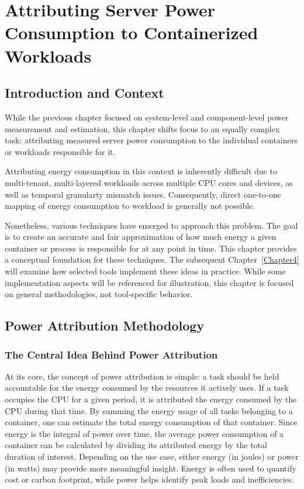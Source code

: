 \chapter{Attributing Server Power Consumption to Containerized Workloads} %
\label{Chapter3}

\section{Introduction and Context}

While the previous chapter focused on system-level and component-level power measurement and estimation, this chapter shifts focus to an equally complex task: attributing measured server power consumption to the individual containers or workloads responsible for it.

Attributing energy consumption in this context is inherently difficult due to  multi-tenant, multi-layered workloads across multiple CPU cores and devices, as well as temporal granularty mismatch issues. Consequently, direct one-to-one mapping of energy consumption to workload is generally not possible.

Nonetheless, various techniques have emerged to approach this problem. The goal is to create an accurate and fair approximation of how much energy a given container or process is responsible for at any point in time. This chapter provides a conceptual foundation for these techniques. The subsequent Chapter~\ref{Chapter4} will examine how selected tools implement these ideas in practice. While some implementation aspects will be referenced for illustration, this chapter is focused on general methodologies, not tool-specific behavior.

\section{Power Attribution Methodology}

\subsection{The Central Idea Behind Power Attribution}

At its core, the concept of power attribution is simple: a task should be held accountable for the energy consumed by the resources it actively uses. If a task occupies the CPU for a given period, it is attributed the energy consumed by the CPU during that time. By summing the energy usage of all tasks belonging to a container, one can estimate the total energy consumption of that container. Since energy is the integral of power over time, the average power consumption of a container can be calculated by dividing its attributed energy by the total duration of interest. Depending on the use case, either energy (in joules) or power (in watts) may provide more meaningful insight. Energy is often used to quantify cost or carbon footprint, while power helps identify peak loads and inefficiencies.

